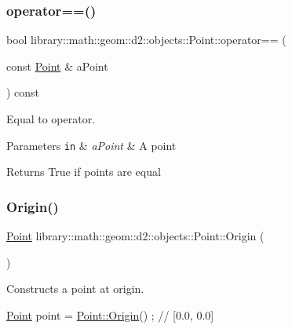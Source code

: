 \subsubsection{\texorpdfstring{operator==()}{operator==()}}
{\footnotesize\ttfamily bool library\+::math\+::geom\+::d2\+::objects\+::\+Point\+::operator== (\begin{DoxyParamCaption}\item[{const \hyperlink{classlibrary_1_1math_1_1geom_1_1d2_1_1objects_1_1_point}{Point} \&}]{a\+Point }\end{DoxyParamCaption}) const}



Equal to operator. 


\begin{DoxyParams}[1]{Parameters}
\mbox{\tt in}  & {\em a\+Point} & A point \\
\hline
\end{DoxyParams}
\begin{DoxyReturn}{Returns}
True if points are equal 
\end{DoxyReturn}
\mbox{\label{classlibrary_1_1math_1_1geom_1_1d2_1_1objects_1_1_point_ac372ec5b87ab91d58dc515eda2f0fa75}} 
\subsubsection{\texorpdfstring{Origin()}{Origin()}}
{\footnotesize\ttfamily \hyperlink{classlibrary_1_1math_1_1geom_1_1d2_1_1objects_1_1_point}{Point} library\+::math\+::geom\+::d2\+::objects\+::\+Point\+::\+Origin (\begin{DoxyParamCaption}{ }\end{DoxyParamCaption})\hspace{0.3cm}{\ttfamily [static]}}



Constructs a point at origin. 


\begin{DoxyCode}
\hyperlink{classlibrary_1_1math_1_1geom_1_1d2_1_1objects_1_1_point_a4998aefdf80bdfd967f21d49fa050398}{Point} point = \hyperlink{classlibrary_1_1math_1_1geom_1_1d2_1_1objects_1_1_point_ac372ec5b87ab91d58dc515eda2f0fa75}{Point::Origin}() ; \textcolor{comment}{// [0.0, 0.0]}
\end{DoxyCode}


